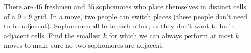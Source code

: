 There are $46$ freshmen and $35$ sophomores who place themselves in distinct cells of a $9\times 9$ grid. In a move, two people can switch places (these people don't need to be adjacent). Sophomores all hate each other, so they don't want to be in adjacent cells. Find the smallest $k$ for which we can always perform at most $k$ moves to make sure no two sophomores are adjacent.
